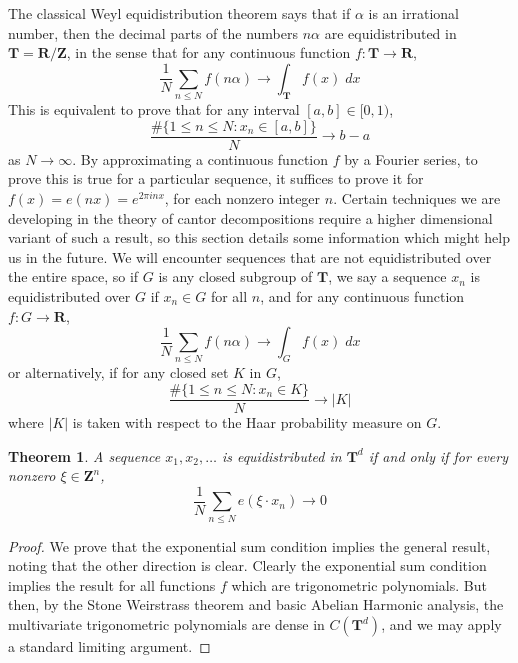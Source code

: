 \documentclass{report}
\theoremstyle{plain}
\theoremstyle{plain}
\newtheorem{theorem}{Theorem}
\begin{document}
The classical Weyl equidistribution theorem says that if $\alpha$ is an irrational number, then the decimal parts of the numbers $n \alpha$ are equidistributed in $\mathbf{T} = \mathbf{R}/\mathbf{Z}$, in the sense that for any continuous function $f: \mathbf{T} \to \mathbf{R}$,
%
\[ \frac{1}{N} \sum_{n \leq N} f(n \alpha) \to \int_{\mathbf{T}} f(x)\; dx \]
%
This is equivalent to prove that for any interval $[a,b] \in [0,1)$,
%
\[ \frac{\# \{ 1 \leq n \leq N : x_n \in [a,b] \}}{N} \to b - a \]
%
as $N \to \infty$. By approximating a continuous function $f$ by a Fourier series, to prove this is true for a particular sequence, it suffices to prove it for $f(x) = e(nx) = e^{2 \pi i n x}$, for each nonzero integer $n$. Certain techniques we are developing in the theory of cantor decompositions require a higher dimensional variant of such a result, so this section details some information which might help us in the future. We will encounter sequences that are not equidistributed over the entire space, so if $G$ is any closed subgroup of $\mathbf{T}$, we say a sequence $x_n$ is equidistributed over $G$ if $x_n \in G$ for all $n$, and for any continuous function $f: G \to \mathbf{R}$,
%
\[ \frac{1}{N} \sum_{n \leq N} f(n \alpha) \to \int_G f(x)\; dx \]
%
or alternatively, if for any closed set $K$ in $G$,
%
\[ \frac{\# \{ 1 \leq n \leq N: x_n \in K \}}{N} \to |K| \]
%
where $|K|$ is taken with respect to the Haar probability measure on $G$.

\begin{theorem}
    A sequence $x_1, x_2, \dots$ is equidistributed in $\mathbf{T}^d$ if and only if for every nonzero $\xi \in \mathbf{Z}^n$,
    \[ \frac{1}{N} \sum_{n \leq N} e(\xi \cdot x_n) \to 0 \]
\end{theorem}
\begin{proof}
    We prove that the exponential sum condition implies the general result, noting that the other direction is clear. Clearly the exponential sum condition implies the result for all functions $f$ which are trigonometric polynomials. But then, by the Stone Weirstrass theorem and basic Abelian Harmonic analysis, the multivariate trigonometric polynomials are dense in $C(\mathbf{T}^d)$, and we may apply a standard limiting argument.
\end{proof}
\end{document}
